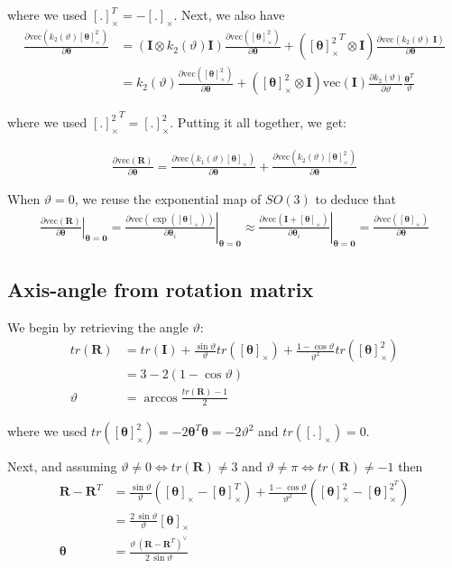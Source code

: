 \documentclass{article}
\renewcommand\aa{\bm{\theta}}
\renewcommand\t{\vartheta}
\newcommand\R{\bm{R}}
\newcommand\I{\bm{I}}
\renewcommand\skew[1]{[#1]_{\times}}
\newcommand\vecop[1]{\text{vec} \left( #1\right)}
\begin{document}
where we used $\skew{.}^T = - \skew{.}$. Next, we also have
\begin{align}
  \frac{\partial \vecop{k_2(\t) \skew{\aa}^2}}{\partial \aa}  
  &= \left( \I \otimes k_2(\t)\I \right) \frac{\partial \vecop{\skew{\aa}^2}}{\partial \aa}
    + \left({\skew{\aa}^2}^T \otimes \I \right) \frac{\partial \vecop{k_2(\t)\;\I}}{\partial \aa} \\
  &= k_2(\t) \frac{\partial \vecop{\skew{\aa}^2}}{\partial \aa}
    + \left({\skew{\aa}^2} \otimes \I \right) \vecop{\I} \frac{\partial k_2(\t)}{\partial \t} \frac{\aa^T}{\t}
\end{align}

where we used ${\skew{.}^2}^T = \skew{.}^2$. Putting it all together, we get:

\begin{align}
  \frac{\partial \vecop{\R}}{\partial \aa} = 
    \frac{\partial \vecop{k_1(\t) \skew{\aa}}}{\partial \aa}  
    + \frac{\partial \vecop{k_2(\t) \skew{\aa}^2}}{\partial \aa}  
\end{align}

When $\t = 0$, we reuse the exponential map of $SO(3)$ to deduce that 
\begin{align}
  \left. \frac{\partial \vecop{\R}}{\partial \aa} \right \vert_{\aa = \bm{0}} =
  \left. \frac{\partial \vecop{\exp(\skew{\aa})}}{\partial \aa_i} \right \vert_{\aa = \bm{0}} \approx
  \left. \frac{\partial \vecop{\I + \skew{\aa}}}{\partial \aa_i} \right \vert_{\aa = \bm{0}} =
  \frac{\partial \vecop{\skew{\aa}}}{\partial \aa}
\end{align}

\subsection{Axis-angle from rotation matrix}
We begin by retrieving the angle $\t$:
\begin{align}
  tr(\R) 
    &= tr(\I) + \frac{\sin \t }{\t} tr(\skew{\aa}) + \frac{1 - \cos \t}{\t^2} tr(\skew{\aa}^2) \\
    &= 3 - 2 (1 - \cos \t) \\
  \t &=  \arccos \frac{tr(\R) - 1}{2}
\end{align}

where we used $tr(\skew{\aa}^2) =  - 2 \aa^T \aa = -2\t^2$ and $tr(\skew{.}) = 0$.

Next, and assuming $\t \neq 0 \iff tr(\R) \neq 3$ and $\t \neq \pi \iff tr(\R) \neq -1$ then
\begin{align}
  \R - \R^T 
    &= \frac{\sin{\t}}{\t} \left(\skew{\aa} - \skew{\aa}^T\right)
    + \frac{1 - \cos \t}{\t^2} \left( \skew{\aa}^2 - \skew{\aa}^{2^T} \right) \\
    &= \frac{2\, \sin \t}{\t} \skew{\aa} \\
  \aa &= \frac{\t \, \left(\R - \R^T \right)^\vee }{2\, \sin \t}
\end{align}
\end{document}
